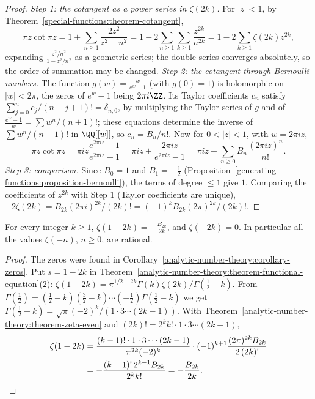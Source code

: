 \begin{proof}
\emph{Step 1: the cotangent as a power series in $\zeta(2k)$.} For $|z| < 1$, by Theorem~\ref{special-functions:theorem-cotangent},
\[
\pi z\cot\pi z = 1 + \sum_{n \geq 1}\frac{2z^2}{z^2 - n^2} = 1 - 2\sum_{n \geq 1}\sum_{k \geq 1}\frac{z^{2k}}{n^{2k}} = 1 - 2\sum_{k \geq 1}\zeta(2k)z^{2k},
\]
expanding $\frac{z^2/n^2}{1 - z^2/n^2}$ as a geometric series; the double series converges absolutely, so the order of summation may be changed.
\emph{Step 2: the cotangent through Bernoulli numbers.} The function $g(w) = \frac{w}{e^w - 1}$ (with $g(0) = 1$) is holomorphic on $|w| < 2\pi$, the zeros of $e^w - 1$ being $2\pi i\ZZ$. Its Taylor
coefficients $c_n$ satisfy $\sum_{j=0}^nc_j/(n - j + 1)! = \delta_{n,0}$, by multiplying the Taylor series of $g$ and of $\frac{e^w - 1}{w} = \sum w^n/(n + 1)!$; these equations determine the inverse of
$\sum w^n/(n + 1)!$ in $\QQ[[w]]$, so $c_n = B_n/n!$. Now for $0 < |z| < 1$, with $w = 2\pi iz$,
\[
\pi z\cot\pi z = \pi iz\frac{e^{2\pi iz} + 1}{e^{2\pi iz} - 1} = \pi iz + \frac{2\pi iz}{e^{2\pi iz} - 1} = \pi iz + \sum_{n \geq 0}B_n\frac{(2\pi iz)^n}{n!}.
\]
\emph{Step 3: comparison.} Since $B_0 = 1$ and $B_1 = -\frac12$ (Proposition~\ref{generating-functions:proposition-bernoulli}), the terms of degree $\leq 1$ give $1$. Comparing the coefficients of
$z^{2k}$ with Step 1 (Taylor coefficients are unique), $-2\zeta(2k) = B_{2k}(2\pi i)^{2k}/(2k)! = (-1)^kB_{2k}(2\pi)^{2k}/(2k)!$.
\end{proof}

\begin{corollary}\label{analytic-number-theory:corollary-zeta-negative}
For every integer $k \geq 1$, $\zeta(1 - 2k) = -\frac{B_{2k}}{2k}$, and $\zeta(-2k) = 0$. In particular all the values $\zeta(-n)$, $n \geq 0$, are rational.
\end{corollary}

\begin{proof}
The zeros were found in Corollary~\ref{analytic-number-theory:corollary-zeros}. Put $s = 1 - 2k$ in Theorem~\ref{analytic-number-theory:theorem-functional-equation}(2):
$\zeta(1 - 2k) = \pi^{1/2 - 2k}\Gamma(k)\zeta(2k)/\Gamma(\frac12 - k)$. From $\Gamma(\frac12) = (\frac12 - k)(\frac32 - k)\cdots(-\frac12)\Gamma(\frac12 - k)$ we get
$\Gamma(\frac12 - k) = \sqrt{\pi}(-2)^k/(1 \cdot 3 \cdots (2k - 1))$. With Theorem~\ref{analytic-number-theory:theorem-zeta-even} and $(2k)! = 2^kk!\cdot 1 \cdot 3 \cdots (2k - 1)$,
\[
\begin{aligned}
\zeta(1 - 2k) &= \frac{(k - 1)!\cdot 1 \cdot 3 \cdots (2k - 1)}{\pi^{2k}(-2)^k}\cdot(-1)^{k+1}\frac{(2\pi)^{2k}B_{2k}}{2\,(2k)!} \\
&= -\frac{(k - 1)!\,2^{k-1}B_{2k}}{2^kk!} = -\frac{B_{2k}}{2k}.
\end{aligned} \qedhere
\]
\end{proof}

